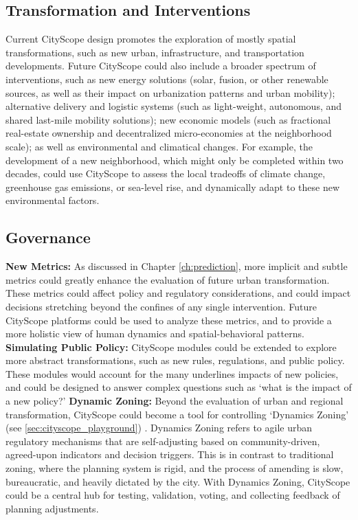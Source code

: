{{      \subsection{Transformation and Interventions}
      {
          Current CityScope design promotes the exploration of mostly spatial transformations, such as new urban, infrastructure, and transportation developments. Future CityScope could also include a broader spectrum of interventions, such as new energy solutions (solar, fusion, or other renewable sources, as well as their impact on urbanization patterns and urban mobility); alternative delivery and logistic systems (such as light-weight, autonomous, and shared last-mile mobility solutions); new economic models (such as fractional real-estate ownership and decentralized micro-economies at the neighborhood scale); as well as environmental and climatical changes. For example, the development of a new neighborhood, which might only be completed within two decades, could use CityScope to assess the local tradeoffs of climate change, greenhouse gas emissions, or sea-level rise, and dynamically adapt to these new environmental factors.
      }

      \subsection{Governance}
      {
          \textbf{New Metrics:} As discussed in Chapter \eqref{ch:prediction}, more implicit and subtle metrics could greatly enhance the evaluation of future urban transformation. These metrics could affect policy and regulatory considerations, and could impact decisions stretching beyond the confines of any single intervention. Future CityScope platforms could be used to analyze these metrics, and to provide a more holistic view of human dynamics and spatial-behavioral patterns.
          \newline
          \textbf{Simulating Public Policy:} CityScope modules could be extended to explore more abstract transformations, such as new rules, regulations, and public policy. These modules would account for the many underlines impacts of new policies, and could be designed to answer complex questions such as `what is the impact of a new policy?'
          \newline
          \textbf{Dynamic Zoning:} Beyond the evaluation of urban and regional transformation, CityScope could become a tool for controlling `Dynamics Zoning' (see \eqref{sec:cityscope_playground}) \cite{DynamicZ48:online}. Dynamics Zoning refers to agile urban regulatory mechanisms that are self-adjusting based on community-driven, agreed-upon indicators and decision triggers. This is in contrast to traditional zoning, where the planning system is rigid, and the process of amending is slow, bureaucratic, and heavily dictated by the city. With Dynamics Zoning, CityScope could be a central hub for testing, validation, voting, and collecting feedback of planning adjustments. 
      }


}}
